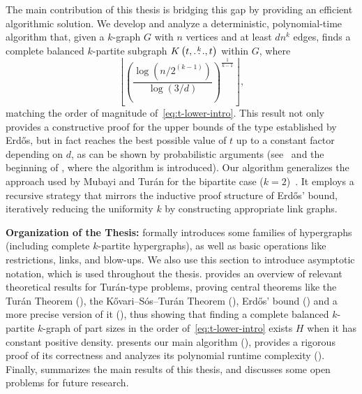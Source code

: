 The main contribution of this thesis is bridging this gap by providing an efficient algorithmic solution.
We develop and analyze a deterministic, polynomial-time algorithm that,
given a $k$-graph $G$ with $n$ vertices and at least $dn^k$ edges,
finds a complete balanced $k$-partite subgraph $K\left(t, \overset{k}{\dots}, t\right)$ within $G$, where
\[
    \left\lfloor \left(  \frac{\log \left(n/2^{(k-1)}\right)}{\log (3/d)} \right)^{\frac{1}{k-1}} \right\rfloor,
\]
matching the order of magnitude of~\eqref{eq:t-lower-intro}.
This result not only provides a constructive proof for the upper bounds of the type established by Erdős,
but in fact reaches the best possible value of $t$ up to a constant factor depending on $d$, as
can be shown by probabilistic arguments (see~ and
the beginning of , where the algorithm is introduced).
Our algorithm generalizes the approach used by Mubayi and Turán for the bipartite case ($k=2$)~\cite{MUBAYI2010174}.
It employs a recursive strategy that mirrors the inductive proof structure of Erdős' bound,
iteratively reducing the uniformity $k$ by constructing appropriate link graphs.

\textbf{Organization of the Thesis:}
 formally introduces some families of hypergraphs
(including complete $k$-partite hypergraphs),
as well as basic operations like restrictions, links, and blow-ups.
We also use this section to introduce asymptotic notation, which is used throughout the thesis.
 provides an overview of relevant theoretical results for Turán-type problems,
proving central theorems like the Turán Theorem (), the Kővari--Sós--Turán Theorem (),
Erdős' bound () and a more precise version of it (),
thus showing that finding a complete balanced $k$-partite $k$-graph of part sizes in the order of~\eqref{eq:t-lower-intro}
exists $H$ when it has constant positive density.
 presents our main algorithm (),
provides a rigorous proof of its correctness and analyzes its polynomial runtime complexity ().
Finally,  summarizes the main results of this thesis, and discusses some open problems for future research.
